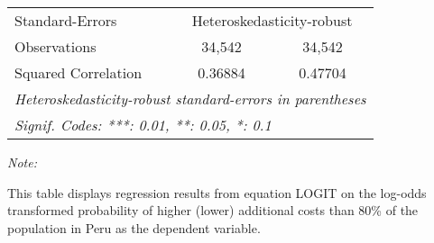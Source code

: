 \begin{table}[htbp!]
\begin{adjustbox}{width = 1\textwidth, max height = 0.95\textheight, center}
\begin{threeparttable}[b]
\begin{tabular}{lcc}
            \midrule 
            Standard-Errors & \multicolumn{2}{c}{Heteroskedasticity-robust} \\ 
            Observations                                  & 34,542        & 34,542\\  
            Squared Correlation                           & 0.36884       & 0.47704\\  
            \midrule \midrule
            \multicolumn{3}{l}{\emph{Heteroskedasticity-robust standard-errors in parentheses}}\\
            \multicolumn{3}{l}{\emph{Signif. Codes: ***: 0.01, **: 0.05, *: 0.1}}\\
         \end{tabular}
         
         \begin{tablenotes}\item \medskip \textit{Note:}
            \item This table displays regression results from equation LOGIT on the log-odds transformed probability of higher (lower) additional costs than 80\% of the population in Peru as the dependent variable. 
         \end{tablenotes}
      \end{threeparttable}
   \end{adjustbox}
\end{table}


